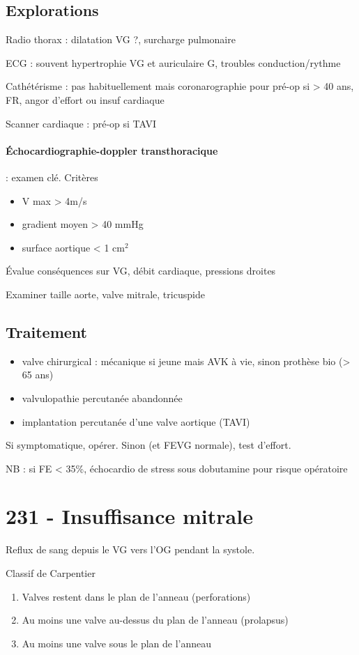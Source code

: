 \subsection{Explorations}
Radio thorax : dilatation VG ?, surcharge pulmonaire

ECG : souvent hypertrophie VG et auriculaire G, troubles conduction/rythme

Cathétérisme : pas habituellement mais coronarographie pour pré-op si \male > 40 ans, FR, angor d'effort ou insuf
cardiaque

Scanner cardiaque : pré-op si \gls{TAVI}

\paragraph{Échocardiographie-doppler transthoracique} : examen clé. Critères
\begin{itemize}
  \item V max > 4m/s
  \item gradient moyen > 40 mmHg
  \item surface aortique < 1 $\text{cm}^2$
\end{itemize}
Évalue conséquences sur VG, débit cardiaque, pressions droites

Examiner taille aorte, valve mitrale, tricuspide

\subsection{Traitement}
\begin{itemize}
  \item valve chirurgical : mécanique si jeune mais AVK à vie, sinon prothèse bio (> 65
    ans)
  \item valvulopathie percutanée abandonnée
  \item implantation percutanée d'une valve aortique (TAVI)
\end{itemize}
Si symptomatique, opérer. Sinon (et FEVG normale), test d'effort.

NB : si FE < 35\%, échocardio de stress sous dobutamine pour risque opératoire


\section{231 - Insuffisance mitrale}%
\label{sec:231_insuffisance_mitrale}
Reflux de sang depuis le VG vers l'OG pendant la systole.

Classif de Carpentier
\begin{enumerate}[label=\Roman*]
  \item Valves restent dans le plan de l'anneau (perforations)
  \item Au moins une valve au-dessus du plan de l'anneau (prolapsus)
  \item Au moins une valve sous le plan de l'anneau
\end{enumerate}

